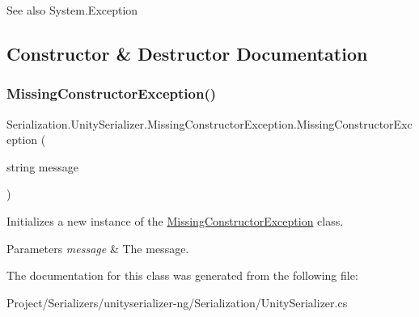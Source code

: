 \begin{DoxySeeAlso}{See also}
System.\+Exception


\end{DoxySeeAlso}


\subsection{Constructor \& Destructor Documentation}
\mbox{\label{class_serialization_1_1_unity_serializer_1_1_missing_constructor_exception_abe6acc36e1c08845f4c41e3aecb243b9}} 
\subsubsection{\texorpdfstring{Missing\+Constructor\+Exception()}{MissingConstructorException()}}
{\footnotesize\ttfamily Serialization.\+Unity\+Serializer.\+Missing\+Constructor\+Exception.\+Missing\+Constructor\+Exception (\begin{DoxyParamCaption}\item[{string}]{message }\end{DoxyParamCaption})\hspace{0.3cm}{\ttfamily [inline]}}



Initializes a new instance of the \hyperlink{class_serialization_1_1_unity_serializer_1_1_missing_constructor_exception}{Missing\+Constructor\+Exception} class. 


\begin{DoxyParams}{Parameters}
{\em message} & The message.\\
\hline
\end{DoxyParams}


The documentation for this class was generated from the following file\+:\begin{DoxyCompactItemize}
\item 
Project/\+Serializers/unityserializer-\/ng/\+Serialization/Unity\+Serializer.\+cs\end{DoxyCompactItemize}
